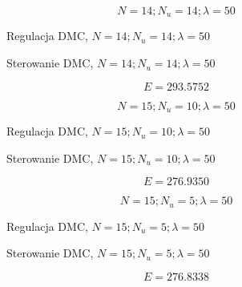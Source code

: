 \begin{equation}
    N = 14; N_u = 14; \lambda = 50
\end{equation}

\begin{figure}[H]
\centering

\caption{Regulacja DMC, $N = 14; N_u = 14; \lambda = 50$}
\end{figure}

\begin{figure}[H]
\centering

\caption{Sterowanie DMC, $N = 14; N_u = 14; \lambda = 50$}
\end{figure}

\begin{equation}
    E = \num{293,5752}
\end{equation}

\begin{equation}
    N = 15; N_u = 10; \lambda = 50
\end{equation}

\begin{figure}[H]
\centering

\caption{Regulacja DMC, $N = 15; N_u = 10; \lambda = 50$}
\end{figure}

\begin{figure}[H]
\centering

\caption{Sterowanie DMC, $N = 15; N_u = 10; \lambda = 50$}
\end{figure}

\begin{equation}
    E = \num{276,9350}
\end{equation}

\begin{equation}
    N = 15; N_u = 5; \lambda = 50
\end{equation}

\begin{figure}[H]
\centering

\caption{Regulacja DMC, $N = 15; N_u = 5; \lambda = 50$}
\end{figure}

\begin{figure}[H]
\centering

\caption{Sterowanie DMC, $N = 15; N_u = 5; \lambda = 50$}
\end{figure}

\begin{equation}
    E = \num{276,8338}
\end{equation}


